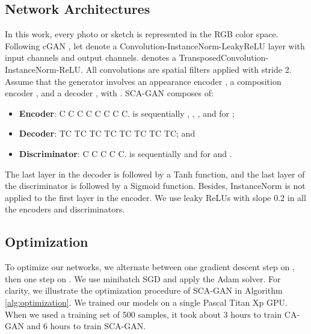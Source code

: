 \documentclass[journal]{IEEEtran}
\begin{document}
\subsection{Network Architectures}
\label{ssec:netarc}

In this work, every photo or sketch is represented in the RGB color space. Following cGAN \cite{Isola2017Pix2Pix}, let  denote a Convolution-InstanceNorm-LeakyReLU layer with  input channels and  output channels.  denotes a TransposedConvolution-InstanceNorm-ReLU. All convolutions are  spatial filters applied with stride 2. Assume that the generator  involves an appearance encoder , a composition encoder , and a decoder , with .
SCA-GAN composes of: 
\begin{itemize}
\item \textbf{Encoder}: C  C  C  C  C  C  C  C.  is sequentially , , , and  for ;

\item \textbf{Decoder}: TC  TC  TC  TC  TC  TC  TC  TC; and


\item \textbf{Discriminator}: C  C  C  C  C.  is sequentially  and  for  and .
\end{itemize}
The last layer in the decoder is followed by a Tanh function, and the last layer of the discriminator is followed by a Sigmoid function. Besides, InstanceNorm is not applied to the first layer in the encoder. We use leaky ReLUs with slope 0.2 in all the encoders and discriminators. 




\subsection{Optimization}
\label{sec:optim}



To optimize our networks, we alternate between one gradient descent step on , then one step on . We use minibatch SGD and apply the Adam solver. For clarity, we illustrate the optimization procedure of SCA-GAN in Algorithm \ref{alg:optimization}. 
We trained our models on a single Pascal Titan Xp GPU. When we used a training set of 500 samples, it took about 3 hours to train CA-GAN and 6 hours to train SCA-GAN.
\end{document}
